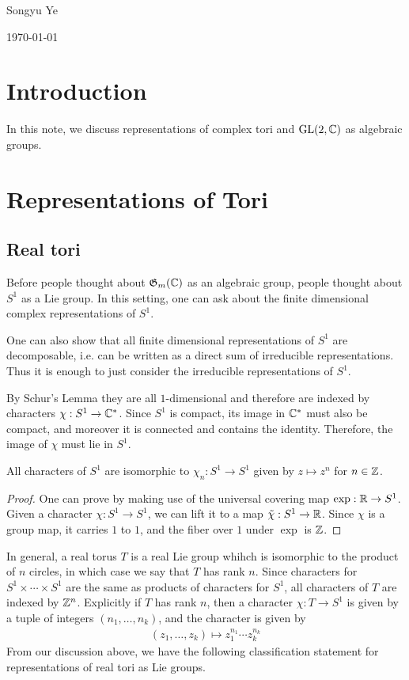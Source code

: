 \documentclass[12pt]{article}
\begin{document}
Songyu Ye

\today
\section{Introduction}
In this note, we discuss representations of complex tori and $\operatorname{GL}(2,\mathbb{C})$ as algebraic groups. 

\section{Representations of Tori}
\subsection{Real tori}
Before people thought about $\mathfrak{G}_m(\mathbb{C})$ as an algebraic group, people thought about $S^1$ as a Lie group.
In this setting, one can ask about the finite dimensional complex representations of $S^1$.

\hfill 

One can also show that all finite dimensional representations of $S^1$ are decomposable, i.e.
can be written as a direct sum of irreducible representations. Thus it is enough to just consider the irreducible representations of $S^1$.

\hfill 

By Schur's Lemma they are all $1$-dimensional and therefore are indexed by characters $\chi: S^1\to \mathbb{C}^*$.
Since $S^1$ is compact, its image in $\mathbb{C}^*$ must also be compact, and moreover
it is connected and contains the identity. Therefore, the image of $\chi$ must lie in $S^1$.


\begin{proposition}
All characters of $S^1$ are isomorphic to $\chi_n: S^1\to S^1$ given by $z\mapsto z^n$ for $n\in \mathbb{Z}$.
\end{proposition}

\begin{proof}
    One can prove by making use of the universal covering map $\exp: \mathbb{R}\to S^1$.
    Given a character $\chi: S^1\to S^1$, we can lift it to a map $\tilde \chi: S^1\to \mathbb{R}$.
    Since $\chi$ is a group map, it carries $1$ to $1$, and the fiber over $1$ under $\exp$ is $\mathbb{Z}$.
\end{proof}

In general, a real torus $T$ is a real Lie group whihch is isomorphic to the product of $n$ circles, 
in which case we say that $T$ has rank $n$. Since characters for $S^1\times\cdots\times S^1$ are the same as products of characters for $S^1$, 
all characters of $T$ are indexed by $\mathbb{Z}^n$. Explicitly if $T$ has rank $n$, then a character $\chi: T\to S^1$ is given by a tuple of integers $(n_1,\ldots, n_k)$, and the character is given by
\begin{align*}
    (z_1,\ldots, z_k)\mapsto z_1^{n_1}\cdots z_k^{n_k}
\end{align*}
From our discussion above, we have the following classification statement for representations of real tori as Lie groups.
\end{document}
